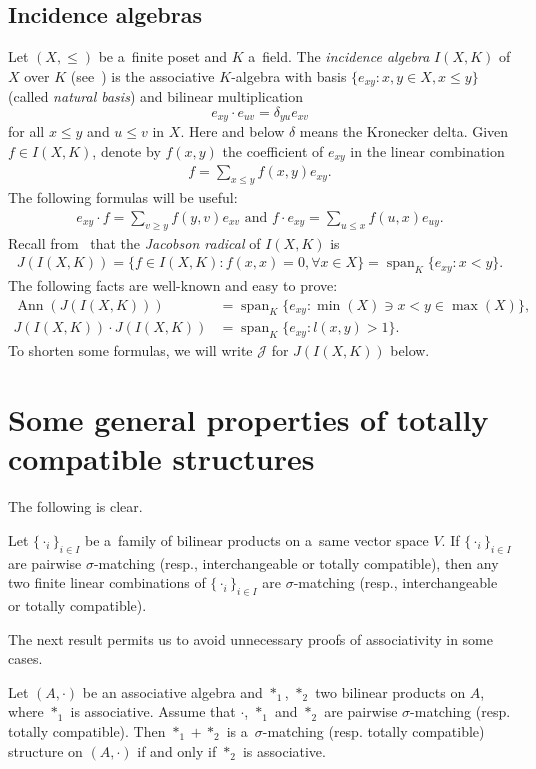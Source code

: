 \documentclass{jonasart}
\newcommand{\dl}{\delta}
\newcommand{\J}{\mathcal{J}}
\newcommand{\sg}{\sigma}
\DeclareMathOperator{\Ann}{Ann}
\DeclareMathOperator{\spn}{span}
\begin{document}
	\subsection{Incidence algebras}

	Let $(X,\le)$ be a~finite poset and $K$ a~field. The \textit{incidence algebra} $I(X,K)$ of $X$ over $K$ (see~\cite{Rota64,SpDo}) is the associative $K$-algebra with basis $\{e_{xy}: x,y\in X, x\le y\}$ (called \textit{natural basis}) and bilinear multiplication
	\[
	e_{xy}\cdot e_{uv}=\dl_{yu}e_{xv}
	\]
	for all $x\leq y$ and $u\leq v$ in $X$. Here and below $\dl$ means the Kronecker delta. Given $f\in I(X,K)$, denote by $f(x,y)$ the coefficient of $e_{xy}$ in the linear combination
	\begin{align*}
		f=\sum_{x\le y}f(x,y)e_{xy}.
	\end{align*}
	The following formulas will be useful:
	\begin{align*}
		e_{xy}\cdot f=\sum_{v\ge y}f(y,v)e_{xv}\text{ and }f\cdot e_{xy}=\sum_{u\le x}f(u,x)e_{uy}.
	\end{align*}
	Recall from~\cite[Theorem 4.2.5]{SpDo} that the \textit{Jacobson radical} of $I(X,K)$ is
	\begin{align*}
		J(I(X,K))=\{f\in I(X,K):f(x,x)=0,\forall x\in X\}=\spn_K\{e_{xy}: x<y\}.
	\end{align*}
	The following facts are well-known and easy to prove:
	\begin{align*}
		\Ann(J(I(X,K)))&=\spn_K\{e_{xy}: \min(X)\ni x<y\in\max(X)\},\\
		J(I(X,K))\cdot J(I(X,K))&=\spn_K\{e_{xy}: l(x,y)>1\}.
	\end{align*}
	To shorten some formulas, we will write $\J$ for $J(I(X,K))$ below.

	\section{Some general properties of totally compatible structures}\label{sec-gen-prop}

	The following is clear.
	\begin{lemma}\label{lin-comb-tot-comp-are-tot-comp}
		Let $\{\cdot_i\}_{i\in I}$ be a~family of bilinear products on a~same vector space $V$. If $\{\cdot_i\}_{i\in I}$ are pairwise $\sg$-matching (resp., interchangeable or totally compatible), then any two finite linear combinations of $\{\cdot_i\}_{i\in I}$ are $\sg$-matching (resp., interchangeable or totally compatible).
	\end{lemma}
	The next result permits us to avoid unnecessary proofs of associativity in some cases.
	\begin{lemma}\label{*_1 +*_2 -tot-comp-str<=>*_2 -ass}
		Let $(A,\cdot)$ be an associative algebra and $*_1$, $*_2$ two bilinear products on $A$, where $*_1$ is associative. Assume that $\cdot$, $*_1$ and $*_2$ are pairwise $\sg$-matching (resp. totally compatible). Then $*_1 +*_2$ is a~$\sg$-matching (resp. totally compatible) structure on $(A,\cdot)$ if and only if $*_2$ is associative.
	\end{lemma}
\end{document}
